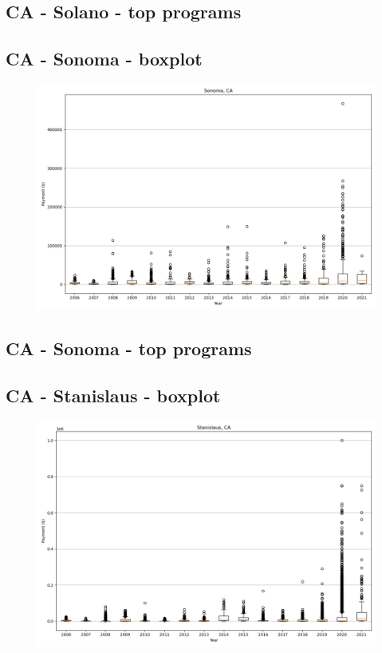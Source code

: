 \subsection*{CA - Solano - top programs}

\newpage
\subsection*{CA - Sonoma - boxplot}
\begin{figure}[h]
\centering
\includegraphics[width=7in]{../output/boxplots/counties/Sonoma-CA_boxplot.png}
\end{figure}


\subsection*{CA - Sonoma - top programs}

\newpage
\subsection*{CA - Stanislaus - boxplot}
\begin{figure}[h]
\centering
\includegraphics[width=7in]{../output/boxplots/counties/Stanislaus-CA_boxplot.png}
\end{figure}


